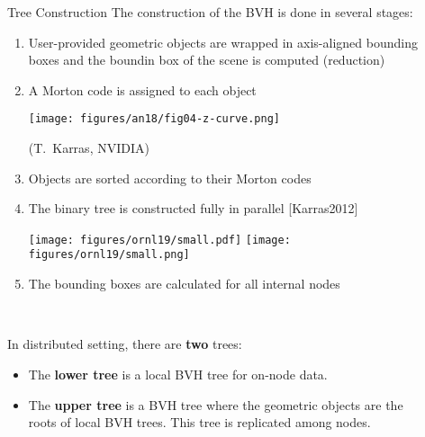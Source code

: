 \documentclass[final,hyperref={pdfpagelabels=false}]{beamer}
\begin{document}
\begin{frame}[t,fragile]
\begin{columns}[t]
\begin{column}{.450\textwidth}
\begin{block}{\centering Tree Construction}
  The construction of the BVH is done in several stages:
  \begin{enumerate}
    \item User-provided geometric objects are wrapped in axis-aligned bounding boxes and the boundin box of the scene is computed (reduction)
    \item
      A Morton code is assigned to each object

      \begin{center}
      \texttt{[image: figures/an18/fig04-z-curve.png]}

        {\small (T.~Karras, NVIDIA)}
      \end{center}
    \item
      Objects are sorted according to their Morton codes
    \item
      The binary tree is constructed fully in parallel [Karras2012]

      \begin{center}
      \texttt{[image: figures/ornl19/small.pdf]}
      \texttt{[image: figures/ornl19/small.png]}
      \end{center}
    \item
      The bounding boxes are calculated for all internal nodes
  \end{enumerate}

  \

  In distributed setting, there are \textbf{two} trees:
  \begin{itemize}
    \item
      The \textbf{lower tree} is a local BVH tree for on-node data.
    \item
      The \textbf{upper tree} is a BVH tree where the geometric objects are the
      roots of local BVH trees. This tree is replicated among nodes.
  \end{itemize}

\end{block}

\end{column} %

\begin{column}{.03\textwidth}\end{column}

\begin{column}{.480\textwidth}


\end{column}
\end{columns}
\end{frame}
\end{document}

